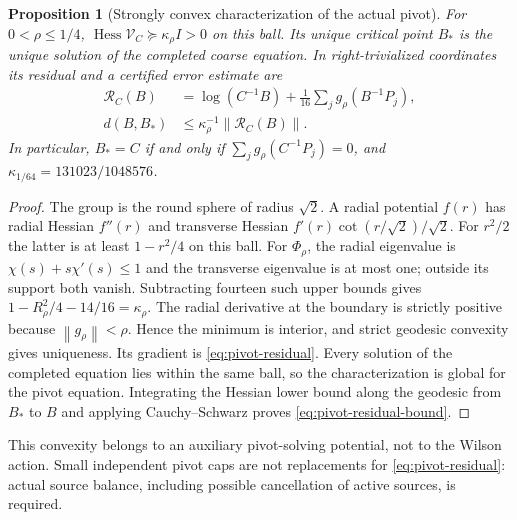 \documentclass[11pt,oneside,openany]{book}
\newtheorem{proposition}[proposition]{Proposition}
\theoremstyle{definition}
\theoremstyle{remark}
\newcommand{\norm}[1]{\left\lVert#1\right\rVert}
\newcommand{\src}[2]{\cite[#2]{#1}}
\begin{document}
\begin{proposition}[Strongly convex characterization of the actual pivot]
\label{prop:pivot-potential}
For $0<\rho\le1/4$,
$\operatorname{Hess}\mathcal V_C\succeq\kappa_\rho I>0$ on this
ball. Its unique critical point $B_*$ is the unique solution of the
completed coarse equation. In right-trivialized coordinates its
residual and a certified error estimate are
\begin{align}
 \mathcal R_C(B)&=\log(C^{-1}B)
             +\tfrac1{16}\sum_j g_\rho(B^{-1}P_j),
             \label{eq:pivot-residual}\\
 d(B,B_*)&\le\kappa_\rho^{-1}\norm{\mathcal R_C(B)}.
             \label{eq:pivot-residual-bound}
\end{align}
In particular, $B_*=C$ if and only if
$\sum_jg_\rho(C^{-1}P_j)=0$, and
$\kappa_{1/64}=131023/1048576$.
\end{proposition}
\begin{proof}
The group is the round sphere of radius $\sqrt2$. A radial potential
$f(r)$ has radial Hessian $f''(r)$ and transverse Hessian
$f'(r)\cot(r/\sqrt2)/\sqrt2$. For $r^2/2$ the latter is at least
$1-r^2/4$ on this ball. For $\Phi_\rho$, the radial eigenvalue is
$\chi(s)+s\chi'(s)\le1$ and the transverse eigenvalue is at most one;
outside its support both vanish. Subtracting fourteen such upper
bounds gives $1-R_\rho^2/4-14/16=\kappa_\rho$.
The radial derivative at the boundary is strictly positive because
$\norm{g_\rho}<\rho$. Hence the minimum is interior, and strict
geodesic convexity gives uniqueness. Its gradient is
\cref{eq:pivot-residual}. Every solution of the completed equation
lies within the same ball, so the characterization is global for the
pivot equation. Integrating the Hessian lower bound along the geodesic
from $B_*$ to $B$ and applying Cauchy--Schwarz proves
\cref{eq:pivot-residual-bound}.
\end{proof}
This convexity belongs to an auxiliary pivot-solving potential, not to
the Wilson action. Small independent pivot caps are not replacements
for \cref{eq:pivot-residual}: actual source balance, including possible
cancellation of active sources, is required. \src{F12}{V98}
\end{document}
